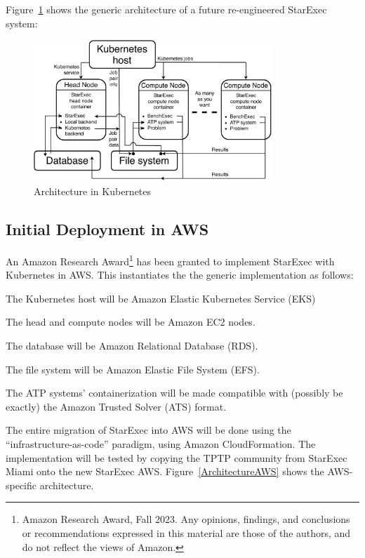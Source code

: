 \documentclass{easychair}
\newenvironment{packed_itemize}{
\vspace*{-0.3em}
\begin{itemize}
\setlength{\partopsep}{0pt}
\setlength{\itemsep}{1pt}
\setlength{\parskip}{0pt}
\setlength{\parsep}{0pt}
}{\end{itemize}}
\newcommand{\dav}[1]{{\color{red}{David: {#1}}}}
\begin{document}
Figure~\ref{ArchitectureK} shows the generic architecture of a future re-engineered StarExec system:

\begin{figure}[htb]
\begin{center}
\includegraphics[width=0.8\textwidth]{ArchitectureK}
\caption{Architecture in Kubernetes}
\label{ArchitectureK}
\end{center}
\end{figure}

\subsection{Initial Deployment in AWS}

\dav{TODO}

An Amazon Research Award\footnote{%
Amazon Research Award, Fall 2023. Any opinions, findings, and conclusions or recommendations 
expressed in this material are those of the authors, and do not reflect the views of Amazon.} 
has been granted to implement StarExec with Kubernetes in AWS.
This instantiates the the generic implementation as follows:
\begin{packed_itemize}
\item The Kubernetes host will be Amazon Elastic Kubernetes Service (EKS)
\item The head and compute nodes will be Amazon EC2 nodes.
\item The database will be Amazon Relational Database (RDS).
\item The file system will be Amazon Elastic File System (EFS).
\item The ATP systems' containerization will be made compatible with (possibly be exactly) the 
      Amazon Trusted Solver (ATS) format.
\end{packed_itemize}

The entire migration of StarExec into AWS will be done using the ``infrastructure-as-code'' 
paradigm, using Amazon CloudFormation. 
The implementation will be tested by copying the TPTP community from StarExec Miami onto the 
new StarExec AWS.
Figure~\ref{ArchitectureAWS} shows the AWS-specific architecture.
\end{document}
